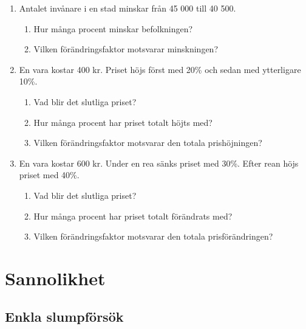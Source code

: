 \documentclass[a4paper,11pt]{article}
\begin{document}
\begin{enumerate}[label=\textbf{\arabic*.}]
    \item Antalet invånare i en stad minskar från 45 000 till 40 500.
    \begin{enumerate}[label=\alph*)]
        \item Hur många procent minskar befolkningen?
        \item Vilken förändringsfaktor motsvarar minskningen?
    \end{enumerate}
    
    \item En vara kostar 400 kr. Priset höjs först med 20\% och sedan med ytterligare 10\%.
    \begin{enumerate}[label=\alph*)]
        \item Vad blir det slutliga priset?
        \item Hur många procent har priset totalt höjts med?
        \item Vilken förändringsfaktor motsvarar den totala prishöjningen?
    \end{enumerate}
    
    \item En vara kostar 600 kr. Under en rea sänks priset med 30\%. Efter rean höjs priset med 40\%.
    \begin{enumerate}[label=\alph*)]
        \item Vad blir det slutliga priset?
        \item Hur många procent har priset totalt förändrats med?
        \item Vilken förändringsfaktor motsvarar den totala prisförändringen?
    \end{enumerate}
\end{enumerate}


\newpage
\section*{Sannolikhet}

\subsection*{Enkla slumpförsök}
\end{document}
